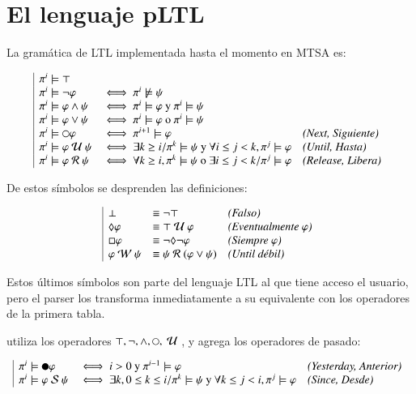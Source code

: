 \section{El lenguaje pLTL}

La gramática de LTL implementada hasta el momento en MTSA es:

\[
	\begin{array}{|l l l}
		\pi^i \models \top \\
		\pi^i \models \neg \varphi & \iff \pi^i \not\models \psi \\
		\pi^i \models \varphi \wedge \psi & \iff \pi^i \models \varphi \text{ y } \pi^i \models \psi \\
		\pi^i \models \varphi \vee \psi & \iff \pi^i \models \varphi \text{ o } \pi^i \models \psi \\
		\pi^i \models \next \varphi & \iff \pi^{i+1} \models \varphi & \textit{(Next, Siguiente)}\\
		\pi^i \models \varphi \until \psi & \iff \exists k \geq i / \pi^k \models \psi \text{ y } \forall i \leq j < k, \pi^j \models \varphi & \textit{(Until, Hasta)}\\
		\pi^i \models \varphi \release \psi & \iff \forall k \geq i, \pi^k \models \psi \text{ o } \exists i \leq j < k / \pi^j \models \varphi & \textit{(Release, Libera)}\\
	\end{array}
\]

De estos símbolos se desprenden las definiciones:

\[
	\begin{array}{|l l l}
		\bot & \equiv \neg \top & \textit{(Falso)} \\
		\lozenge \varphi & \equiv \top \text{ }\mathcal{U}\text{ } \varphi & \textit{(Eventualmente $\varphi$)} \\
		\square \varphi & \equiv \neg \lozenge \neg \varphi & \textit{(Siempre $\varphi$)} \\
		\varphi \text{ }\mathcal{W}\text{ } \psi & \equiv \psi \text{ }\mathcal{R}\text{ } (\varphi \vee \psi) & \textit{(Until débil)}
	\end{array}
\]

Estos últimos símbolos son parte del lenguaje LTL al que tiene acceso el usuario, pero el parser los transforma inmediatamente a su equivalente con los operadores de la primera tabla.

\citet{pnueli93} utiliza los operadores $\top, \neg, \wedge, \next, \until$, y agrega los operadores de pasado:

\[
	\begin{array}{|l l l}
		\pi^i \models \prev \varphi & \iff i > 0 \text{ y } \pi^{i-1} \models \varphi & \textit{(Yesterday, Anterior)}\\
		\pi^i \models \varphi \since \psi & \iff \exists k,  0 \leq k \leq i / \pi^k \models \psi \text{ y } \forall k \leq j < i, \pi^j \models \varphi & \textit{(Since, Desde)}\\
	\end{array}
\]

